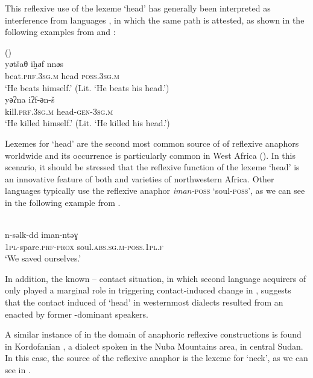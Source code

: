 \documentclass[output=paper]{langsci/langscibook}
\begin{document}
This reflexive use of the lexeme ‘head’ has generally been interpreted as  interference from  languages \citep[197]{ElAissati2011}, in which the same  path is attested, as shown in the following examples from  and : 

\ea
{  (\citealt[95]{Kossmann2000})}\\
\gll   yәtšaθ iḫәf nnәs\\
       beat.\textsc{prf.3sg.m} head \textsc{poss.3sg.m}\\
\glt   `He beats himself.' (Lit. ‘He beats his head.’)
\ex
{  \citep[126]{Taine-Cheikh2008chapter}}\\
\gll   yәʔna iʔf-әn-š\\
       kill.\textsc{prf.3sg.m} head-\textsc{gen-3sg.m}\\
\glt   `He killed himself.' (Lit. ‘He killed his head.’)
\z

Lexemes for ‘head’ are the second most common source of  of reflexive anaphors worldwide \citep{KönigTöpper2013} and its occurrence is particularly common in West Africa (\citealt[50]{Heine2011}). In this scenario, it should be stressed that the reflexive function of the lexeme ‘head’ is an innovative feature of both  and  varieties of northwestern Africa. Other  languages typically use the reflexive anaphor \textit{iman-}\textsc{poss} ‘soul-\textsc{poss}’, as we can see in the following example from .

\ea
{ \citep{Mettouchi2012}}\\
\gll   n-səlk-dd       iman-ntəɣ\\
       \textsc{1pl}-spare.\textsc{prf-prox} soul.\textsc{abs.sg.m-poss.1pl.f}\\
\glt   `We saved ourselves.'\\
\z

In addition, the known – contact situation, in which second language acquirers of  only played a marginal role in triggering contact-induced change in , suggests that the contact induced  of ‘head’ in westernmost  dialects resulted from an  enacted by former -dominant speakers.  

A similar instance of  in the domain of anaphoric reflexive constructions is found in Kordofanian  , a  dialect spoken in the Nuba Mountains area, in central Sudan. In this case, the source of the reflexive anaphor is the lexeme for ‘neck’, as we can see in .  
\end{document}
